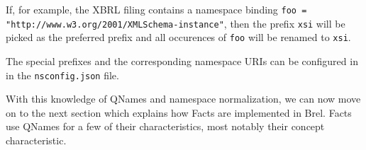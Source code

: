 If, for example, the XBRL filing contains a namespace binding \texttt{foo = "http://www.w3.org/2001/XMLSchema-instance"},
then the prefix \texttt{xsi} will be picked as the preferred prefix and all occurences of \texttt{foo} will be renamed to \texttt{xsi}.

The special prefixes and the corresponding namespace URIs can be configured in in the \texttt{nsconfig.json} file.

With this knowledge of QNames and namespace normalization, we can now move on to the next section which explains how Facts are implemented in Brel.
Facts use QNames for a few of their characteristics, most notably their concept characteristic.